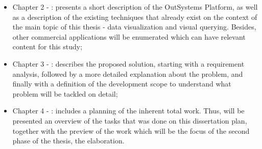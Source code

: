 \begin{itemize}
  \item Chapter 2 - : presents a short description
  of the OutSystems Platform, as well as a description of the existing techniques
  that already exist on the context of the main topic of this thesis - data visualization
  and visual querying. Besides, other commercial applications will be enumerated 
  which can have relevant content for this study;
  \item Chapter 3 - : describes the proposed solution,
  starting with a requirement analysis, followed by a more detailed explanation
  about the problem, and finally with a definition of the development scope to
  understand what problem will be tackled on detail;
  \item Chapter 4 - : includes a planning
  of the inherent total work. Thus, will be presented an overview of the tasks that
  was done on this dissertation plan, together with the preview of the work which
  will be the focus of the second phase of the thesis, the elaboration.
\end{itemize}
